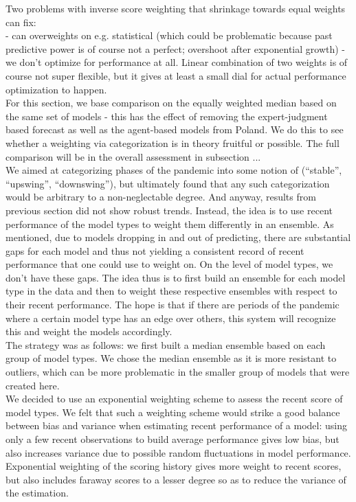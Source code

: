 Two problems with inverse score weighting that shrinkage towards equal weights can fix: \\
- can overweights on e.g. statistical (which could be problematic because past predictive power is of course not a perfect; overshoot after exponential growth)
- we don't optimize for performance at all. Linear combination of two weights is of course not super flexible, but it gives at least a small dial for actual performance optimization to happen. \\
For this section, we base comparison on the equally weighted median based on the same set of models - this has the effect of removing the expert-judgment based forecast as well as the agent-based models from Poland. We do this to see whether a weighting via categorization is in theory fruitful or possible. The full comparison will be in the overall assessment in subsection ...
\\
We aimed at categorizing phases of the pandemic into some notion of (``stable'', ``upswing'', ``downswing''), but ultimately found that any such categorization would be arbitrary to a non-neglectable degree. And anyway, results from previous section did not show robust trends. Instead, the idea is to use recent performance of the model types to weight them differently in an ensemble. As mentioned, due to models dropping in and out of predicting, there are substantial gaps for each model and thus not yielding a consistent record of recent performance that one could use to weight on. On the level of model types, we don't have these gaps. The idea thus is to first build an ensemble for each model type in the data and then to weight these respective ensembles with respect to their recent performance. The hope is that if there are periods of the pandemic where a certain model type has an edge over others, this system will recognize this and weight the models accordingly. \\
The strategy was as follows: we first built a median ensemble based on each group of model types. We chose the median ensemble as it is more resistant to outliers, which can be more problematic in the smaller group of models that were created here.\\
We decided to use an exponential weighting scheme to assess the recent score of model types. We felt that such a weighting scheme would strike a good balance between bias and variance when estimating recent performance of a model: using only a few recent observations to build average performance gives low bias, but also increases variance due to possible random fluctuations in model performance. Exponential weighting of the scoring history gives more weight to recent scores, but also includes faraway scores to a lesser degree so as to reduce the variance of the estimation.\\
